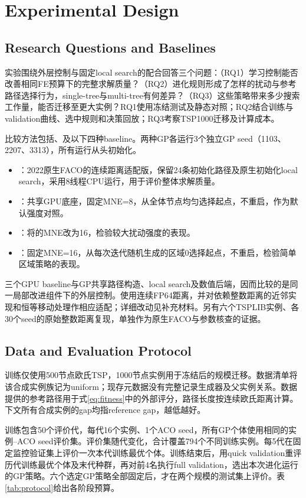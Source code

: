 \section{Experimental Design}
\subsection{Research Questions and Baselines}
实验围绕外层控制与固定local search的配合回答三个问题：（RQ1）学习控制能否改善相同FE预算下的完整求解质量？（RQ2）进化规则形成了怎样的扰动与参考路径选择行为，single-tree与multi-tree有何差异？（RQ3）这些策略带来多少搜索工作量，能否迁移至更大实例？RQ1使用冻结测试及静态对照；RQ2结合训练与validation曲线、选中规则和决策回放；RQ3考察TSP1000迁移及计算成本。

比较方法包括\JS{}、\CT{}及以下四种baseline。两种GP各运行3个独立GP seed（1103、2207、3313），所有运行从头初始化。
\begin{itemize}
 \item \FACO{}：2022原生FACO的连续距离适配版，保留24条初始化路径及原生初始化local search，采用8线程CPU运行，用于评价整体求解质量。
 \item \Ueight{}：共享GPU底座，固定MNE=8，从全体节点均匀选择起点，不重启，作为默认强度对照。
 \item \Usixteen{}：将\Ueight{}的MNE改为16，检验较大扰动强度的表现。
 \item \Rsixteen{}：固定MNE=16，从每次迭代随机生成的区域0选择起点，不重启，检验简单区域策略的表现。
\end{itemize}
三个GPU baseline与GP共享路径构造、local search及数值后端，因而比较的是同一局部改进组件下的外层控制。\FACO{}使用连续FP64距离，并对依赖整数距离的近邻实现和恒等移动处理作相应适配；详细改动见补充材料。另有六个TSPLIB实例、各30个seed的原始整数距离复现\cite{reinelt1991}，单独作为原生FACO与参数核查的证据。

\subsection{Data and Evaluation Protocol}
训练仅使用500节点欧氏TSP，1000节点实例用于冻结后的规模迁移。数据清单将该合成实例族记为uniform；现存元数据没有完整记录生成器及父实例关系。数据提供的参考路径用于式\eqref{eq:fitness}中的外部评分，路径长度按连续欧氏距离计算。下文所有合成实例的gap均指reference gap，越低越好。

训练包含50个评价代，每代16个实例、1个ACO seed，所有GP个体使用相同的实例--ACO seed评价集。评价集随代变化，合计覆盖794个不同训练实例。每5代在固定监控验证集上评价一次本代训练最优个体。训练结束后，用quick validation重评历代训练最优个体及末代种群，再对前4名执行full validation，选出本次进化运行的GP策略。六个选定GP策略全部固定后，才在两个规模的测试集上评价。表\ref{tab:protocol}给出各阶段预算。

